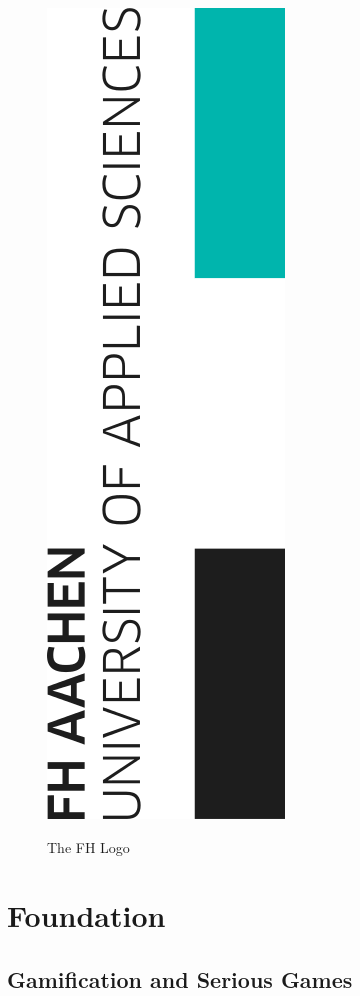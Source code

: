 \begin{figure}
	\caption{The FH Logo \autocite[]{Online:FhAachen}}
	\includegraphics[scale=0.7]{figures/FHLogoFromSVG.png}
	\label{figure:fhLogo} %
\end{figure}
\par
\lipsum[1]
\lipsum[2]

\chapter{Foundation}
	\section{Gamification and Serious Games}
